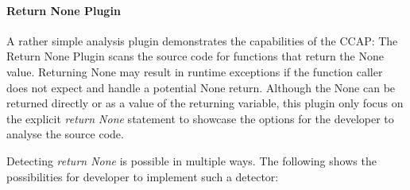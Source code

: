 \paragraph{Return None Plugin}
A rather simple analysis plugin demonstrates the capabilities of the CCAP: The Return None Plugin scans the source code for functions that return the None value. Returning None may result in runtime exceptions if the function caller does not expect and handle a potential None return. Although the None can be returned directly or as a value of the returning variable, this plugin only focus on the explicit \textit{return None} statement to showcase the options for the developer to analyse the source code.

Detecting \textit{return None} is possible in multiple ways. The following shows the possibilities for developer to implement such a detector:
